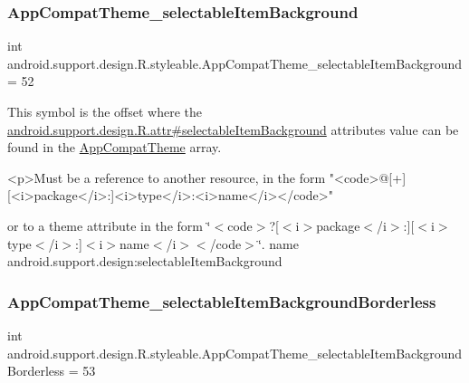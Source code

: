 \subsubsection{\texorpdfstring{App\+Compat\+Theme\+\_\+selectable\+Item\+Background}{AppCompatTheme\_selectableItemBackground}}
{\footnotesize\ttfamily int android.\+support.\+design.\+R.\+styleable.\+App\+Compat\+Theme\+\_\+selectable\+Item\+Background = 52\hspace{0.3cm}{\ttfamily [static]}}

This symbol is the offset where the \hyperlink{classandroid_1_1support_1_1design_1_1R_1_1attr_aa055c8d97d831aa8514926ba6216696f}{android.\+support.\+design.\+R.\+attr\#selectable\+Item\+Background} attribute\textquotesingle{}s value can be found in the \hyperlink{classandroid_1_1support_1_1design_1_1R_1_1styleable_afb351dc8de20cbd4c89abe360373010c}{App\+Compat\+Theme} array.

\begin{DoxyVerb}      <p>Must be a reference to another resource, in the form "<code>@[+][<i>package</i>:]<i>type</i>:<i>name</i></code>"
\end{DoxyVerb}
 or to a theme attribute in the form \char`\"{}$<$code$>$?\mbox{[}$<$i$>$package$<$/i$>$\+:\mbox{]}\mbox{[}$<$i$>$type$<$/i$>$\+:\mbox{]}$<$i$>$name$<$/i$>$$<$/code$>$\char`\"{}.  name android.\+support.\+design\+:selectable\+Item\+Background \mbox{\label{classandroid_1_1support_1_1design_1_1R_1_1styleable_aece61d63468a2001739bbddff229db4f}} 
\subsubsection{\texorpdfstring{App\+Compat\+Theme\+\_\+selectable\+Item\+Background\+Borderless}{AppCompatTheme\_selectableItemBackgroundBorderless}}
{\footnotesize\ttfamily int android.\+support.\+design.\+R.\+styleable.\+App\+Compat\+Theme\+\_\+selectable\+Item\+Background\+Borderless = 53\hspace{0.3cm}{\ttfamily [static]}}

